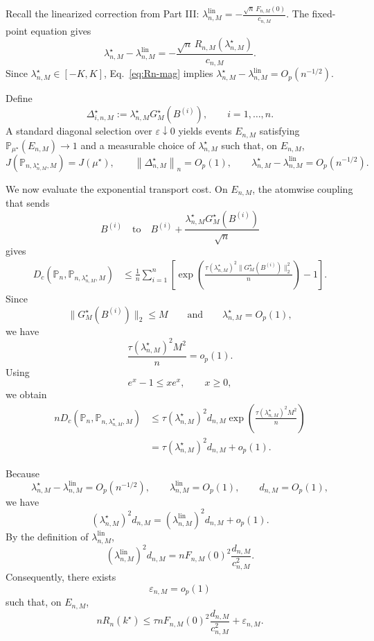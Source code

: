 \documentclass[11pt]{article}
\theoremstyle{definition}
\begin{document}
Recall the linearized correction from Part III: $\lambda_{n,M}^{\mathrm{lin}}
=
-
\frac{
\sqrt n\,F_{n,M}(0)
}{
c_{n,M}
}.$
The fixed-point equation gives
\[
\lambda_{n,M}^\star
-
\lambda_{n,M}^{\mathrm{lin}}
=
-
\frac{
\sqrt n\,R_{n,M}(\lambda_{n,M}^\star)
}{
c_{n,M}
}.
\]
Since $\lambda_{n,M}^\star\in[-K,K]$, Eq.~\eqref{eq:Rn-mag} implies $\lambda_{n,M}^\star
-
\lambda_{n,M}^{\mathrm{lin}}
=
O_p(n^{-1/2}).$

Define
\[
\Delta_{i,n,M}^\star
:=
\lambda_{n,M}^\star
G_M^\star(B^{(i)}),
\qquad
i=1,\ldots,n.
\]
A standard diagonal selection over $\varepsilon\downarrow0$ yields
events $E_{n,M}$ satisfying $\mathbb P_{\mu^\star}(E_{n,M})\longrightarrow1$
and a measurable choice of $\lambda_{n,M}^\star$ such that, on
$E_{n,M}$,
\begin{equation}\label{eq:existence}
J\!\left(
\mathbb P_{n,\lambda_{n,M}^\star,M}
\right)
=
J(\mu^\star),
\qquad
\left\|
\Delta_{n,M}^\star
\right\|_n
=
O_p(1),
\qquad
\lambda_{n,M}^\star
-
\lambda_{n,M}^{\mathrm{lin}}
=
O_p(n^{-1/2}).
\end{equation}

We now evaluate the exponential transport cost. On $E_{n,M}$, the
atomwise coupling that sends
\[
B^{(i)}
\quad\text{to}\quad
B^{(i)}
+
\frac{
\lambda_{n,M}^\star
G_M^\star(B^{(i)})
}{
\sqrt n
}
\]
gives
\[
\begin{aligned}
D_c\!\left(
\mathbb P_n,
\mathbb P_{n,\lambda_{n,M}^\star,M}
\right)
&\leq
\frac1n
\sum_{i=1}^n
\left[
\exp\!\left(
\frac{
\tau(\lambda_{n,M}^\star)^2
\|G_M^\star(B^{(i)})\|_2^2
}{n}
\right)
-1
\right].
\end{aligned}
\]
Since
\[
\|G_M^\star(B^{(i)})\|_2\leq M
\qquad\text{and}\qquad
\lambda_{n,M}^\star=O_p(1),
\]
we have
\[
\frac{
\tau(\lambda_{n,M}^\star)^2M^2
}{n}
=
o_p(1).
\]
Using
\[
e^x-1\leq xe^x,
\qquad x\geq0,
\]
we obtain
\[
\begin{aligned}
nD_c\!\left(
\mathbb P_n,
\mathbb P_{n,\lambda_{n,M}^\star,M}
\right)
&\leq
\tau(\lambda_{n,M}^\star)^2
d_{n,M}
\exp\!\left(
\frac{
\tau(\lambda_{n,M}^\star)^2M^2
}{n}
\right)
\\
&=
\tau(\lambda_{n,M}^\star)^2d_{n,M}
+
o_p(1).
\end{aligned}
\]

Because
\[
\lambda_{n,M}^\star
-
\lambda_{n,M}^{\mathrm{lin}}
=
O_p(n^{-1/2}),
\qquad
\lambda_{n,M}^{\mathrm{lin}}=O_p(1),
\qquad
d_{n,M}=O_p(1),
\]
we have
\[
(\lambda_{n,M}^\star)^2d_{n,M}
=
(\lambda_{n,M}^{\mathrm{lin}})^2d_{n,M}
+
o_p(1).
\]
By the definition of $\lambda_{n,M}^{\mathrm{lin}}$,
\[
(\lambda_{n,M}^{\mathrm{lin}})^2d_{n,M}
=
nF_{n,M}(0)^2
\frac{d_{n,M}}{c_{n,M}^2}.
\]
Consequently, there exists
\[
\varepsilon_{n,M}=o_p(1)
\]
such that, on $E_{n,M}$,
\begin{equation}\label{eq:fixed-M-upper-bound}
nR_n(k^\star)
\leq
\tau nF_{n,M}(0)^2
\frac{d_{n,M}}{c_{n,M}^2}
+
\varepsilon_{n,M}.
\end{equation}
\end{document}
